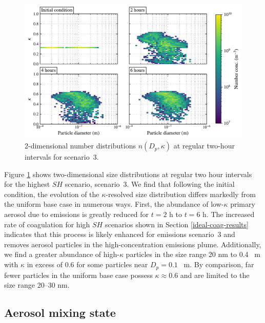 \begin{figure}[!t]
  \centering
    \includegraphics[width=\textwidth]{figures/chapter5/2d-kappa-dist-4-panel-point-source-1x1-z40.pdf}
    \caption{2-dimensional number distributions $n(D_p, \kappa)$ at regular two-hour intervals for scenario~3.}
    \label{fig:2d-kappa-dist-s3}
\end{figure}

Figure \ref{fig:2d-kappa-dist-s3} shows two-dimensional size distributions at regular two hour intervals for the highest $SH$ scenario, scenario~3. We find that following the initial condition, the evolution of the $\kappa$-resolved size distribution differs markedly from the uniform base case in numerous ways. First, the abundance of low-$\kappa$ primary aerosol due to emissions is greatly reduced for $t=2$ h to $t=6$ h. The increased rate of coagulation for high $SH$ scenarios shown in Section \ref{ideal-coag-results} indicates that this process is likely enhanced for emissions scenario~3 and removes aerosol particles in the high-concentration emissions plume. Additionally, we find a greater abundance of high-$\kappa$ particles in the size range 20 nm to 0.4 \si{\mu m} with $\kappa$ in excess of 0.6 for some particles near $D_p=0.1$ \si{\mu m}. By comparison, far fewer particles in the uniform base case possess $\kappa\approx0.6$ and are limited to the size range 20--30 nm. 

\subsection{Aerosol mixing state}

